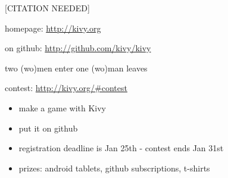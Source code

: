 \documentclass{beamer}
\begin{document}
\begin{frame}{[CITATION NEEDED]}

homepage:  \url{http://kivy.org}

on github: \url{http://github.com/kivy/kivy}

\end{frame}


\begin{frame}{two (wo)men enter one (wo)man leaves}

contest: \url{http://kivy.org/\#contest}

\begin{itemize}
  \item make a game with Kivy
  \item put it on github
  \item registration deadline is Jan 25th - contest ends Jan 31st
  \item prizes: android tablets, github subscriptions, t-shirts
\end{itemize}
\end{frame}
\end{document}
